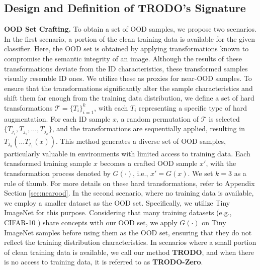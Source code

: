 \subsection{Design and Definition of TRODO's Signature}
 \textbf{OOD Set Crafting.} 
To obtain a set of OOD samples, we propose two scenarios. In the first scenario, a portion of the clean training data is available for the given classifier. Here, the OOD set is obtained by applying transformations known to compromise the semantic integrity of an image. Although the results of these transformations deviate from the ID characteristics, these transformed samples visually resemble ID ones. We utilize these as proxies for near-OOD samples. To ensure that the transformations significantly alter the sample characteristics and shift them far enough from the training data distribution, we define a set of hard transformations \(\mathcal{T} = \{T_i\}_{i=1}^{k}\), with each \(T_i\) representing a specific type of hard augmentation. For each ID sample \(x\), a random permutation of \(\mathcal{T}\) is selected \(\{T_{j_1},T_{j_2},\ldots,T_{j_k}\}\), and the transformations are sequentially applied, resulting in \(T_{j_k}(\ldots T_{j_1}(x))\). This method generates a diverse set of OOD samples, particularly valuable in environments with limited access to training data. Each transformed training sample \(x\) becomes a crafted OOD sample \(x'\), with the transformation process denoted by \(G(\cdot)\), i.e., \(x' = G(x)\). We set $k=3$ as a rule of thumb. For more details on these hard transformations, refer to Appendix Section \ref{sec:nearood}.
In the second scenario, where no training data is available, we employ a smaller dataset as the OOD set. Specifically, we utilize Tiny ImageNet \cite{imagenet} for this purpose. Considering that many training datasets (e.g., CIFAR-10 \cite{cifar}) share concepts with our OOD set, we apply \(G(\cdot)\) on Tiny ImageNet samples before using them as the OOD set, ensuring that they do not reflect the training distribution characteristics. In scenarios where a small portion of clean training data is available, we call our method \textbf{TRODO}, and when there is no access to training data, it is referred to as \textbf{TRODO-Zero}.


